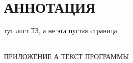 

\section*{АННОТАЦИЯ}


\newpage
тут лист ТЗ, а не эта пустая страница

\renewcommand{\contentsname}{\normalsize \bfseries СОДЕРЖАНИЕ}
\textbf{
\tableofcontents
}
\hspace{0pt}\\
ПРИЛОЖЕНИЕ А ТЕКСТ ПРОГРАММЫ

\newcommand{\GPRPhantomSection}[2]{{
    \newpage
    \phantomsection
    \addcontentsline{toc}{section}{#1}
    \section*{#1}
    
    \newpage
}}
\newcommand{\GPRSectionHeader}[1]{{
    \newpage
    \section{\textbf{#1}}
}}
\newcommand{\GPRSection}[2]{{
    \def \VarGPRSection {#2}
    \newpage
    \section{\textbf{#1}}
    
    \newpage
}}
\newcommand{\GPRSectionFile}[2]{{
    \def \VarGPRSection {#2}
    \newpage
    \section{\textbf{#1}}
    
    \newpage
}}
\newcommand{\GPRSubSectionHeader}[1]{{
    \subsection{\textbf{#1}}
}}
\newcommand{\GPRSubSubSectionHeader}[1]{{
    \subsubsection{\textbf{#1}}
}}
\newcommand{\GPRSubSection}[2]{{
    \GPRSubSectionHeader{#1}
    
}}
\newcommand{\GPREconomicSection}[2]{{
    \def \VarGPREconomicAnnotaion {#1}
    \def \VarGPREconomicConclusion {#2}
    
    \newpage
}}

